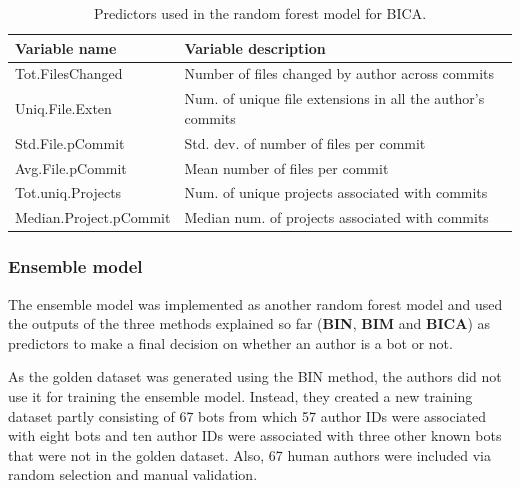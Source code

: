 \documentclass[a4paper, 12pt]{book}
\begin{document}
\begin{table}[htb]
\renewcommand{\arraystretch}{1.2}
 \begin{center}
  \begin{tabular}{   p{5cm}   %
    >{\raggedright\arraybackslash} p{10cm} }  
    \toprule
    \textbf{Variable name} & \textbf{Variable description}\\ 
    \midrule
    Tot.FilesChanged & Number of files changed by author across commits  \\ %
    Uniq.File.Exten & Num. of unique file extensions in all the author's commits \\ %
    Std.File.pCommit & Std. dev. of number of files per commit \\ %
    Avg.File.pCommit & Mean number of files per commit \\ %
    Tot.uniq.Projects & Num. of unique projects associated with commits\\ %
    Median.Project.pCommit & Median num. of projects associated with commits\\
    \bottomrule
  \end{tabular}
  \caption{Predictors used in the random forest model for BICA.}
  \label{table:dey-table-predictors}
 \end{center}
\end{table}


\subsubsection{Ensemble model}
\label{sssec:dey-ensemble}

The ensemble model was implemented as another random forest model and used the outputs of the three methods explained so far (\textbf{BIN}, \textbf{BIM} and \textbf{BICA}) as predictors to make a final decision on whether an author is a bot or not.

As the golden dataset was generated using the BIN method, the authors did not use it for training the ensemble model. Instead, they created a new training dataset partly consisting of 67 bots from which 57 author IDs were associated with eight bots and ten author IDs were associated with three other known bots that were not in the golden dataset. Also, 67 human authors were included via random selection and manual validation. 
\end{document}
